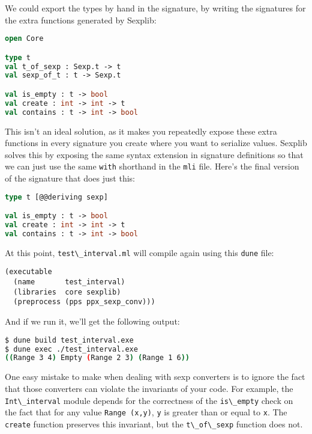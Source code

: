 We could export the types by hand in the signature, by writing the
signatures for the extra functions generated by Sexplib:

\begin{lstlisting}[language=Caml]
open Core

type t
val t_of_sexp : Sexp.t -> t
val sexp_of_t : t -> Sexp.t

val is_empty : t -> bool
val create : int -> int -> t
val contains : t -> int -> bool
\end{lstlisting}

This isn't an ideal solution, as it makes you repeatedly expose these
extra functions in every signature you create where you want to
serialize values. Sexplib solves this by exposing the same syntax
extension in signature definitions so that we can just use the same
\passthrough{\lstinline!with!} shorthand in the
\passthrough{\lstinline!mli!} file. Here's the final version of the
signature that does just this:

\begin{lstlisting}[language=Caml]
type t [@@deriving sexp]

val is_empty : t -> bool
val create : int -> int -> t
val contains : t -> int -> bool
\end{lstlisting}

At this point, \passthrough{\lstinline!test\_interval.ml!} will compile
again using this \passthrough{\lstinline!dune!} file:

\begin{lstlisting}
(executable
  (name       test_interval)
  (libraries  core sexplib)
  (preprocess (pps ppx_sexp_conv)))
\end{lstlisting}

And if we run it, we'll get the following output:

\begin{lstlisting}[language=bash]
$ dune build test_interval.exe
$ dune exec ./test_interval.exe
((Range 3 4) Empty (Range 2 3) (Range 1 6))
\end{lstlisting}

One easy mistake to make when dealing with sexp converters is to ignore
the fact that those converters can violate the invariants of your code.
For example, the \passthrough{\lstinline!Int\_interval!} module depends
for the correctness of the \passthrough{\lstinline!is\_empty!} check on
the fact that for any value \passthrough{\lstinline!Range (x,y)!},
\passthrough{\lstinline!y!} is greater than or equal to
\passthrough{\lstinline!x!}. The \passthrough{\lstinline!create!}
function preserves this invariant, but the
\passthrough{\lstinline!t\_of\_sexp!} function does not.

